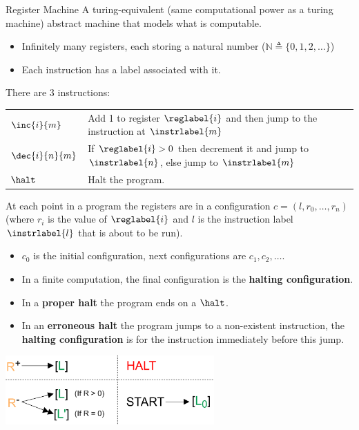 \begin{definitionbox}{Register Machine}
	A turing-equivalent (same computational power as a turing machine) abstract machine that models what is computable.
	\begin{itemize}
		\item Infinitely many registers, each storing a natural number ($\mathbb{N} \triangleq \{0, 1, 2, \dots\}$)
		\item Each instruction has a label associated with it.
    \end{itemize}
    There are 3 instructions:
    \begin{center}
        \begin{tabular}{l l}
            $\inc{i}{m}$    & Add 1 to register $\reglabel{i}$ and then jump to the instruction at $\instrlabel{m}$               \\
            $\dec{i}{n}{m}$ & If $\reglabel{i} > 0$ then decrement it and jump to $\instrlabel{n}$, else jump to $\instrlabel{m}$ \\
            $\halt$         & Halt the program.
        \end{tabular}
    \end{center}
	At each point in a program the registers are in a configuration $c = (l, r_0, \dots, r_n)$ (where $r_i$ is the value of $\reglabel{i}$ and $l$ is the instruction label $\instrlabel{l}$ that is about to be run).
	\begin{itemize}
		\item $c_0$ is the initial configuration, next configurations are $c_1, c_2, \dots$.
		\item In a finite computation, the final configuration is the \textbf{halting configuration}.
		\item In a \textbf{proper halt} the program ends on a $\halt$.
		\item In an \textbf{erroneous halt} the program jumps to a non-existent instruction, the \textbf{halting configuration} is for the instruction immediately before this jump.
    \end{itemize}
    \begin{center}
        \includegraphics[width=0.6\textwidth]{register_machines/images/graphical_register_machine.drawio.png}
    \end{center}
\end{definitionbox}

